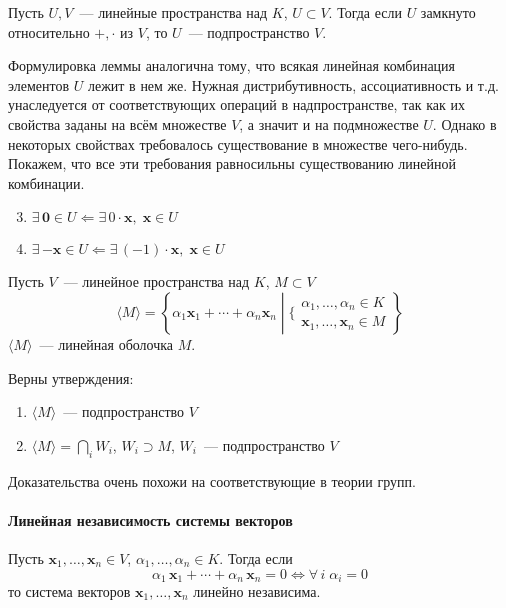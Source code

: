 \documentclass[12pt]{../../notes}
\begin{document}
\begin{lem}\label{lem:linspsign}
  Пусть $U,V$~--- линейные пространства над $K$, $U \subset V$. Тогда если $U$ замкнуто относительно
  $+, \cdot$  из  $V$, то  $U$~--- подпространство
  $V$.
\end{lem}
\begin{itlproof}
  Формулировка леммы аналогична тому, что всякая линейная комбинация элементов $U$ лежит в нем же.
  Нужная дистрибутивность, ассоциативность и т.д. унаследуется от соответствующих операций в 
  надпространстве, так как их свойства заданы на всём множестве $V$, а значит и на подмножестве $U$.
  Однако в некоторых свойствах требовалось существование в множестве чего-нибудь.
  Покажем, что все эти требования равносильны существованию линейной комбинации.
  \begin{enumerate}
      \setcounter{enumi}{2}
    \item $\exists\, \mathbf{0}\in U \Leftarrow \exists\, 0\cdot \mathbf{x},\; \mathbf{x}\in U$
    \item $\exists\, \mathbf{-x}\in U \Leftarrow \exists\, (-1)\cdot \mathbf{x},\; \mathbf{x}\in U$
  \end{enumerate}
\end{itlproof}

{ \label{defn:linshell}
Пусть $V$~--- линейное пространства над $K$, $M \subset V$
\[
  \langle M \rangle = 
  \left\{ \alpha_1 \mathbf{x}_1 + \dotsb + \alpha_n \mathbf{x}_n \middle|
  \Big\{ \begin{array}{l}
    \alpha_1, \dotsc, \alpha_n \in K\\
    \mathbf{x}_1, \dotsc, \mathbf{x}_n \in M
  \end{array} \right\}
\] 
$\langle M \rangle$~--- линейная оболочка $M$.
}
\begin{lem}\label{lem:linshell}
  Верны утверждения:
  \begin{enumerate}
    \item $\langle M \rangle$~--- подпространство $V$
    \item $ \langle M \rangle = \bigcap\limits_i W_i$, $W_i \supset M$, $W_i$~--- подпространство $V$
  \end{enumerate}
\end{lem}
\begin{itlproof}
  Доказательства очень похожи на соответствующие в теории групп.
\end{itlproof}

\paragraph{Линейная независимость системы векторов}

{\label{defn:linindp} Пусть $\mathbf{x}_1,\dotsc, \mathbf{x}_n \in V$, 
$\alpha_1, \dotsc, \alpha_n \in K$.
Тогда если 
\[
  \alpha_1\,\mathbf{x}_1 + \dotsb + \alpha_n\,\mathbf{x}_n = 0 \Leftrightarrow \forall\,i\;\alpha_i = 0
\]
то система векторов $\mathbf{x}_1, \dotsc, \mathbf{x}_n$ линейно независима.
}
\end{document}
